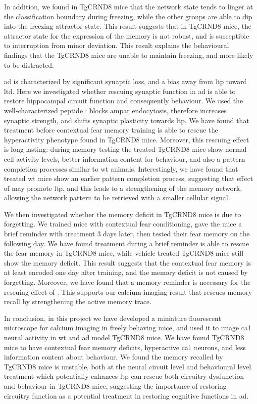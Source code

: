 In addition, we found in TgCRND8 mice that the network state tends to linger at the classification boundary during freezing, while the other groups are able to dip into the freezing attractor state. This result suggests that in TgCRND8 mice, the attractor state for the expression of the memory is not robust, and is susceptible to interruption from minor deviation. This result explains the behavioural findings that the TgCRND8 mice are unable to maintain freezing, and more likely to be distracted. 

\Gls{ad} is characterized by significant synaptic loss, and a bias away from \gls{ltp} toward \gls{ltd}. Here we investigated whether rescuing synaptic function in \gls{ad} is able to restore hippocampal circuit function and consequently behaviour. We used the well-characterized peptide \tglu{}: \tglu{} blocks \gls{ampar} endocytosis, therefore increases synaptic strength, and shifts synaptic plasticity towards \gls{ltp}. We have found that \tglu{} treatment before contextual fear memory training is able to rescue the hyperactivity phenotype found in TgCRND8 mice. Moreover, this rescuing effect is long lasting: during memory testing the treated TgCRND8 mice show normal cell activity levels, better information content for behaviour, and also a pattern completion processes similar to \gls{wt} animals. Interestingly, we have found that \tglu{} treated \gls{wt} mice show an earlier pattern completion process, suggesting that effect of \tglu{} may promote \gls{ltp}, and this leads to a strengthening of the memory network, allowing the network pattern to be retrieved with a smaller cellular signal. 

We then investigated whether the memory deficit in TgCRND8 mice is due to forgetting. We trained mice with contextual fear conditioning, gave the mice a brief reminder with \tglu{} treatment 3 days later, then tested their fear memory on the following day. We have found \tglu{} treatment during a brief reminder is able to rescue the fear memory in TgCRND8 mice, while vehicle treated TgCRND8 mice still show the memory deficit. This result suggests that the contextual fear memory is at least encoded one day after training, and the memory deficit is not caused by forgetting. Moreover, we have found that a memory reminder is necessary for the rescuing effect of \tglu{}. This supports our calcium imaging result that \tglu{} rescues memory recall by strengthening the active memory trace. 

In conclusion, in this project we have developed a miniature fluorescent microscope for calcium imaging in freely behaving mice, and used it to image \gls{ca1} neural activity in \gls{wt} and \gls{ad} model TgCRND8 mice. We have found TgCRND8 mice to have contextual fear memory deficits, hyperactive \gls{ca1} neurons, and less information content about behaviour. We found the memory recalled by TgCRND8 mice is unstable, both at the neural circuit level and behavioural level. \tglu{} treatment which potentially enhances \gls{ltp} can rescue both circuitry dysfunction and behaviour in TgCRND8 mice, suggesting the importance of restoring circuitry function as a potential treatment in restoring cognitive functions in \gls{ad}.

